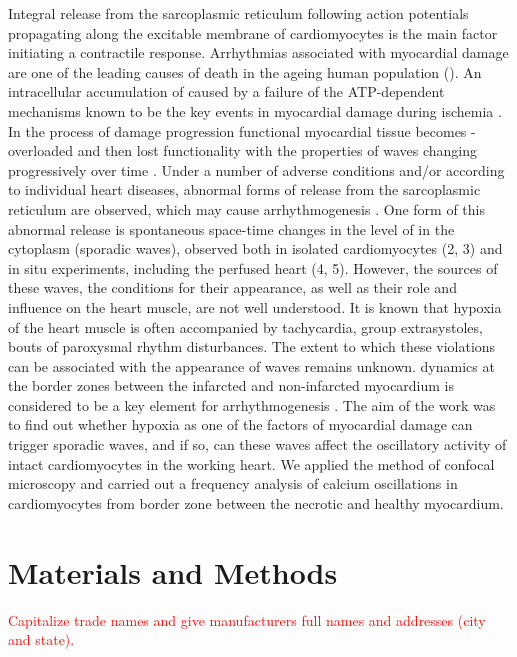 \documentclass{biophys-new}
\begin{document}
Integral  release from the sarcoplasmic reticulum following action potentials propagating along the excitable membrane of cardiomyocytes is the main factor initiating a contractile response.
Arrhythmias associated with myocardial damage are one of the leading causes of death in the ageing human population (\cite{xiao2011cardiac}).
An intracellular accumulation of  caused by a failure of the ATP-dependent mechanisms known to be the key events in myocardial damage during ischemia \cite{shen1972myocardial,shen1972kinetics,nayler1981role}.
In the process of damage progression functional myocardial tissue becomes -overloaded and then lost functionality with the properties of  waves changing progressively over time \cite{minamikawa1997situ,hama1998real}.
Under a number of adverse conditions and/or according to individual heart diseases, abnormal forms of  release from the sarcoplasmic reticulum are observed, which may cause arrhythmogenesis \cite{ishide1990propagation}.
One form of this abnormal release is spontaneous space-time changes in the level of  in the cytoplasm (sporadic  waves), observed both in isolated cardiomyocytes (2, 3) and in situ experiments, including the perfused heart (4, 5).
However, the sources of these waves, the conditions for their appearance, as well as their role and influence on the heart muscle, are not well understood.
It is known that hypoxia of the heart muscle is often accompanied by tachycardia, group extrasystoles, bouts of paroxysmal rhythm disturbances.
The extent to which these violations can be associated with the appearance of  waves remains unknown.
 dynamics at the border zones between the infarcted and non-infarcted myocardium is considered to be a key element for arrhythmogenesis \cite{takamatsu2008arrhythmogenic}.
The aim of the work was to find out whether hypoxia as one of the factors of myocardial damage can trigger sporadic  waves, and if so, can these waves affect the oscillatory activity of intact cardiomyocytes in the working heart.
We applied the method of confocal microscopy and carried out a frequency analysis of calcium oscillations in cardiomyocytes from border zone between the necrotic and healthy myocardium.


\section*{Materials and Methods}

\textcolor{red}{Capitalize trade names and give manufacturers full names and addresses (city and state).}
\end{document}
